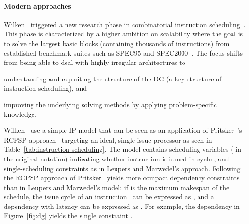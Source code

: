 \documentclass[acmsmall,authorversion,nonacm]{acmart}
\newcommand{\var}[2]{}
\begin{document}
\paragraph{Modern approaches}

Wilken~\etal{} triggered a new research phase in combinatorial
instruction scheduling~\cite{Wilken2000}.
This phase is characterized by a higher ambition on scalability where
the goal is to solve the largest basic blocks (containing thousands of
instructions) from established benchmark suites such as SPEC95 and
SPEC2000~\cite{CPU}.
The focus shifts from being able to deal with highly irregular
architectures to
\begin{inparaitem}[]
\item understanding and exploiting the structure of the DG (a key
  structure of instruction scheduling), and
\item improving the underlying solving methods by applying
  problem-specific knowledge.
\end{inparaitem}

Wilken~\etal{} use a simple IP model that can be seen as an
application of Pritsker~\etal{}'s RCPSP approach~\cite{Pritsker1969}
targeting an ideal, single-issue processor as seen in
Table~\ref{tab:instruction-scheduling}.
The model contains scheduling variables \var{s}{i,k} ( in the
original notation) indicating whether instruction  is issued in
cycle , and single-scheduling constraints as in Leupers and
Marwedel's approach.
Following the RCPSP approach of Pritsker~\etal{} yields more compact
dependency constraints than in Leupers and Marwedel's model: if 
is the maximum makespan of the schedule, the issue cycle of an
instruction~ can be expressed as , and a dependency  with latency
 can be expressed as .
For example, the dependency  in
Figure~\ref{fig:dg} yields the single constraint .
\end{document}
